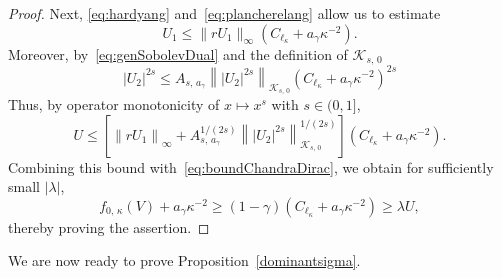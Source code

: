 \documentclass[AHL,Unicode,longabstracts,published]{cedram}
\newcommand*\cK{\mathcal{K}}
\begin{document}
\begin{proof}
Next, \eqref{eq:hardyang} and~\eqref{eq:plancherelang} allow us to estimate
\begin{equation}
U_1 \leq \|rU_1\|_\infty \left(C_{\ell_\kappa}+a_\gamma \kappa^{-2}\right).
\end{equation}
Moreover, by~\eqref{eq:genSobolevDual} and the definition of $\cK_{s,\,0}$
\[
|U_2|^{2s}
\leq A_{s,\,a_\gamma}\left\||U_2|^{2s}\right\|_{\cK_{s,\,0}}\left(C_{\ell_\kappa} +a_\gamma \kappa^{-2}\right)^{2s}
\]
Thus, by operator monotonicity of $x\mapsto x^s$ with $s\in(0,1]$,
\[
U \leq
\left[\left\|rU_1\right\|_\infty+A_{s,\,a_\gamma}^{1/(2s)}\left\||U_2|^{2s}\right\|_{\cK_{s,\,0}}^{1/(2s)}\right] \left(C_{\ell_\kappa}+a_\gamma \kappa^{-2}\right).
\]
Combining this bound with~\eqref{eq:boundChandraDirac}, we obtain for sufficiently small $|\lambda|$,
\[
f_{0,\,\kappa}(V)+a_\gamma \kappa^{-2}
\geq (1-\gamma)\left(C_{\ell_\kappa}+a_\gamma \kappa^{-2}\right)
\geq \lambda U,
\]
thereby proving the assertion.
\end{proof}

We are now ready to prove Proposition~\ref{dominantsigma}.
\end{document}
